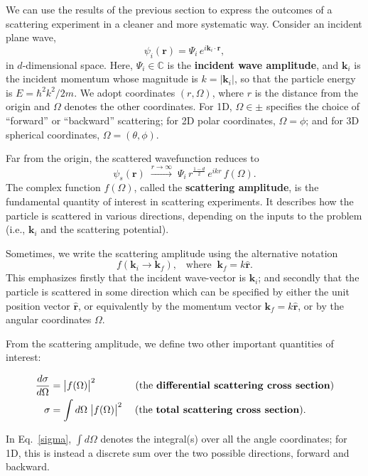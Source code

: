 \documentclass[pra,12pt]{revtex4}
\begin{document}
We can use the results of the previous section to express the outcomes
of a scattering experiment in a cleaner and more systematic way.
Consider an incident plane wave,
\begin{equation}
  \psi_i(\mathbf{r}) = \Psi_i \, e^{i\mathbf{k}_i\cdot\mathbf{r}},
\end{equation}
in $d$-dimensional space.  Here, $\Psi_i \in \mathbb{C}$ is the
\textbf{incident wave amplitude}, and $\mathbf{k}_i$ is the incident
momentum whose magnitude is $k = |\mathbf{k}_i|$, so that the particle
energy is $E = \hbar^2k^2/2m$.  We adopt coordinates $(r,\Omega)$,
where $r$ is the distance from the origin and $\Omega$ denotes the
other coordinates.  For 1D, $\Omega \in \pm$ specifies the choice of
``forward'' or ``backward'' scattering; for 2D polar coordinates,
$\Omega = \phi$; and for 3D spherical coordinates, $\Omega =
(\theta,\phi)$.

Far from the origin, the scattered wavefunction reduces to
\begin{equation}
  \psi_s(\mathbf{r})\;  \overset{r\rightarrow\infty}{\longrightarrow}\; \Psi_i \, r^{\frac{1-d}{2}} \, e^{ikr} \, f(\Omega).
\end{equation}
The complex function $f(\Omega)$, called the \textbf{scattering
  amplitude}, is the fundamental quantity of interest in scattering
experiments.  It describes how the particle is scattered in various
directions, depending on the inputs to the problem (i.e.,
$\mathbf{k}_i$ and the scattering potential).

Sometimes, we write the scattering amplitude using the alternative
notation
\begin{equation}
  f(\mathbf{k}_i \rightarrow \mathbf{k}_f), \;\;\;\mathrm{where}\;\; \mathbf{k}_f = k \hat{\mathbf{r}}.
\end{equation}
This emphasizes firstly that the incident wave-vector is
$\mathbf{k}_i$; and secondly that the particle is scattered in some
direction which can be specified by either the unit position vector
$\hat{\mathbf{r}}$, or equivalently by the momentum vector
$\mathbf{k}_f = k \hat{\mathbf{r}}$, or by the angular coordinates
$\Omega$.

From the scattering amplitude, we define two other important
quantities of interest:
\begin{framed}
  \begin{align}
    \frac{d\sigma}{d\Omega} &= \big|f(\Omega)\big|^2 \qquad\quad\quad \text{(the \textbf{differential scattering cross section})} \\ \sigma &= \int d\Omega\; \big|f(\Omega)\big|^2 \quad\; \text{(the \textbf{total scattering cross section}).} \label{sigma}
  \end{align}
\end{framed}
\vskip -0.05in
\noindent
In Eq.~\eqref{sigma}, $\int d\Omega$ denotes the integral(s) over all
the angle coordinates; for 1D, this is instead a discrete sum over the
two possible directions, forward and backward.
\end{document}
